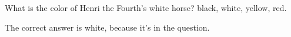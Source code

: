 \documentclass{article}
\begin{document}
\begin{question}{What is the color of Henri the Fourth's white horse?}
\false black,
\true white,
\false yellow,
\false red.
\end{question}
\begin{correction}
The correct answer is white, because it's in the question.
\end{correction}
\end{document}
